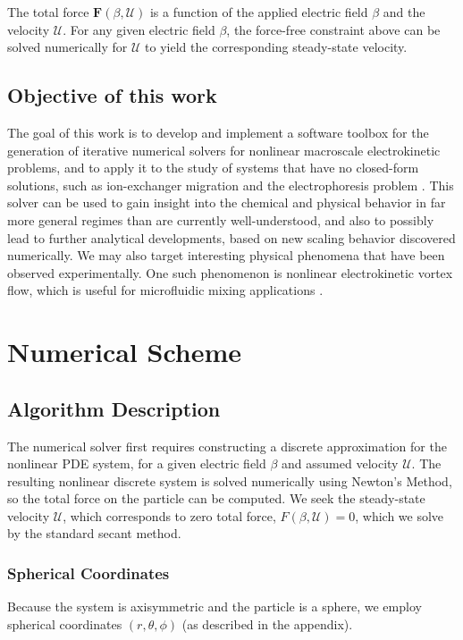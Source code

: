 \documentclass[preprint,10pt]{elsarticle}
\newcommand\bF{\boldsymbol{F}}
\newcommand\cU{\mathscr{U}}
\begin{document}
The total force $\bF(\beta, \cU)$ is a function of the applied electric field $\beta$ and
the velocity $\cU$.
For any given electric field $\beta$, the force-free constraint above 
can be solved numerically for $\cU$ to yield the corresponding steady-state velocity.

\subsection{Objective of this work}

The goal of this work is to develop and implement a software toolbox 
for the generation of iterative numerical solvers for nonlinear macroscale 
electrokinetic problems, and to apply it to the study
of systems that have no closed-form solutions, 
such as ion-exchanger migration \cite{yariv2010migration} 
and the electrophoresis problem \cite{schnitzer2012surface}.
This solver can be used to gain insight into the chemical 
and physical behavior in far more general regimes than 
are currently well-understood, 
and also to possibly lead to further analytical developments, 
based on new scaling behavior
discovered numerically. 
We may also target interesting physical
phenomena that have been observed experimentally.
One such phenomenon is nonlinear electrokinetic vortex flow, 
which is useful for microfluidic mixing applications 
\cite{wang2004mix, ben2002vortex}.


\section{Numerical Scheme} \label{ch:algorithm}

\subsection{Algorithm Description} \label{sec:algorithm}
The numerical solver first requires constructing a discrete 
approximation for the nonlinear PDE system,
for a given electric field $\beta$ and assumed velocity $\cU$. 
The resulting nonlinear discrete system is
solved numerically using Newton's Method, so the total force on the
particle can be computed. 
We seek the steady-state velocity $\cU$, 
which corresponds to zero total force, $F(\beta, \cU) = 0$,
which we solve by the standard secant method.

\subsubsection{Spherical Coordinates}
Because the system is axisymmetric and the particle is a sphere, we employ
spherical coordinates $(r,\theta,\phi)$ (as described in the appendix).
\end{document}
